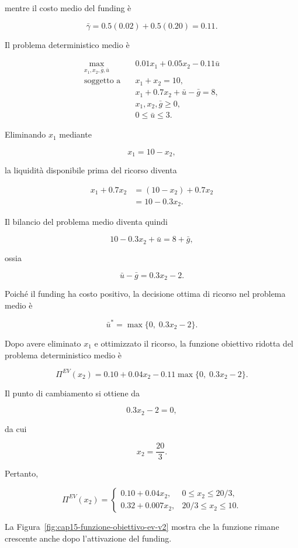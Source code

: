 \begin{enumerate}
mentre il costo medio del funding \`e

\[
\bar\gamma
=
0.5(0.02)+0.5(0.20)
=
0.11.
\]

Il problema deterministico medio \`e

\[
\begin{aligned}
\max_{x_1,x_2,\bar g,\bar u}
\quad&
0.01x_1+0.05x_2
-0.11\bar u
\\[4pt]
\text{soggetto a}\quad&
x_1+x_2=10,
\\
&
x_1+0.7x_2+\bar u-\bar g=8,
\\
&
x_1,x_2,\bar g\geq0,
\\
&
0\leq\bar u\leq3.
\end{aligned}
\]

Eliminando $x_1$ mediante

\[
x_1=10-x_2,
\]

la liquidit\`a disponibile
prima del ricorso diventa

\[
\begin{aligned}
x_1+0.7x_2
&=
(10-x_2)+0.7x_2
\\
&=
10-0.3x_2.
\end{aligned}
\]

Il bilancio del problema medio
diventa quindi

\[
10-0.3x_2+\bar u
=
8+\bar g,
\]

ossia

\[
\bar u-\bar g
=
0.3x_2-2.
\]

Poich\'e il funding ha costo positivo,
la decisione ottima di ricorso
nel problema medio \`e

\[
\bar u^*
=
\max\{0,\;0.3x_2-2\}.
\]

Dopo avere eliminato $x_1$
e ottimizzato il ricorso,
la funzione obiettivo ridotta
del problema deterministico medio \`e

\[
\Pi^{EV}(x_2)
=
0.10+0.04x_2
-
0.11\max\{0,\;0.3x_2-2\}.
\]

Il punto di cambiamento si ottiene da

\[
0.3x_2-2=0,
\]

da cui

\[
x_2=\frac{20}{3}.
\]

Pertanto,

\[
\boxed{
\Pi^{EV}(x_2)
=
\begin{cases}
0.10+0.04x_2,
&
0\leq x_2\leq20/3,
\\[4pt]
0.32+0.007x_2,
&
20/3\leq x_2\leq10.
\end{cases}
}
\]

La Figura~\ref{fig:cap15-funzione-obiettivo-ev-v2}
mostra che la funzione rimane crescente
anche dopo l'attivazione del funding.


\end{enumerate}
